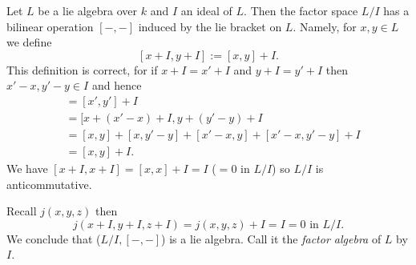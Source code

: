 Let $L$ be a lie algebra over $k$ and $I$ an ideal of $L$. Then the factor space $L/I$ has a bilinear operation $[-,-]$ induced by the lie bracket on $L$. Namely, for $x,y \in L$ we define
\[
  [x + I, y + I] := [x, y] + I.
\]
This definition is correct, for if $x + I = x' + I$ and $y + I = y' + I$ then $x' - x, y' - y \in I$ and hence
\begin{align*}
  [x' + I, y' + I] &= [x', y'] + I\\
                   &= [x + (x' - x) + I, y + (y' - y) + I\\
                   &= [x, y] + [x, y' - y] + [x' - x, y] + [x' - x, y' - y] + I\\
                   &= [x, y] + I.
\end{align*}
We have $[x + I, x + I] = [x, x] + I = I$ ($ = 0 \text{ in } L/I$) so $L/I$ is anticommutative.

Recall $j(x, y, z)$ then
\[
  j(x + I, y + I, z + I) = j(x, y, z) + I = I = 0 \text{ in } L/I.
\]
We conclude that ($L/I, [-,-]$) is a lie algebra. Call it the \emph{factor algebra} of $L$ by $I$.

